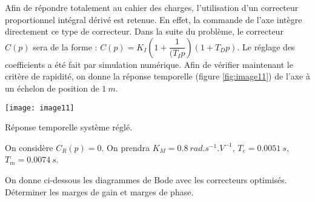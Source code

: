 \ifprof
\else

Afin de répondre totalement au cahier des charges, l'utilisation d'un correcteur proportionnel intégral dérivé est retenue. En effet, la commande de l'axe intègre directement ce type de correcteur. Dans la suite du problème, le correcteur $C(p)$ sera de la forme : $C(p)=K_I \left(1+\dfrac{1}{(T_I p}\right)\left(1+T_D p\right)$. Le réglage des coefficients a été fait par simulation numérique.
Afin de vérifier maintenant le critère de rapidité, on donne la réponse temporelle (figure \ref{fig:image11}) de l'axe à un échelon de position de $\SI{1}{m}$.

\fi

\ifprof
\begin{corrige}
\end{corrige}
\else
\fi

\ifprof
\else
 
\begin{marginfigure}
\texttt{[image: image11]}
\caption{Réponse temporelle système réglé.}
\label{fig:image11}
\end{marginfigure} 

\fi
 

\ifprof
\begin{corrige}
\end{corrige}
\else
\fi

\ifprof
\else

On considère $C_R (p)=0$. On prendra $K_M=\SI{0,8}{rad.s^{-1}.V^{-1}}$, $T_e=\SI{0,0051}{s}$,$T_m=\SI{0,0074}{s}$.
\fi

\ifprof
\begin{corrige}
\end{corrige}
\else
\fi
 
\ifprof
\begin{corrige}
\end{corrige}
\else
\fi

\ifprof
\else

On donne ci-dessous les diagrammes de Bode avec les correcteurs optimisés. Déterminer les marges de gain et marges de phase. 
\fi

